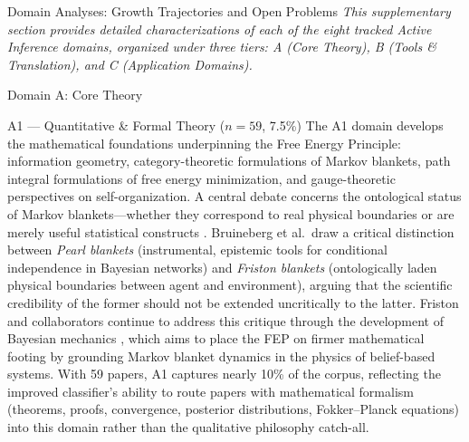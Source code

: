 \documentclass[
  ignorenonframetext,
]{beamer}
\author{\texorpdfstring{}{}}
\date{}
\begin{document}
\begin{frame}{Domain Analyses: Growth Trajectories and Open Problems
\label{sec:subfield_analyses}}
\protect{}\label{domain-analyses-growth-trajectories-and-open-problems}
\emph{This supplementary section provides detailed characterizations of
each of the eight tracked Active Inference domains, organized under
three tiers: A (Core Theory), B (Tools \& Translation), and C
(Application Domains).}

\begin{block}{Domain A: Core Theory}
\protect{}\label{domain-a-core-theory}
\begin{block}{A1 --- Quantitative \& Formal Theory (\(n = 59\), 7.5\%)}
\protect{}\label{a1-quantitative-formal-theory-n-59-7.5}
The A1 domain develops the mathematical foundations underpinning the
Free Energy Principle: information geometry, category-theoretic
formulations of Markov blankets, path integral formulations of free
energy minimization, and gauge-theoretic perspectives on
self-organization. A central debate concerns the ontological status of
Markov blankets---whether they correspond to real physical boundaries or
are merely useful statistical constructs \citep{bruineberg2022emperor}.
Bruineberg et al.~draw a critical distinction between \emph{Pearl
blankets} (instrumental, epistemic tools for conditional independence in
Bayesian networks) and \emph{Friston blankets} (ontologically laden
physical boundaries between agent and environment), arguing that the
scientific credibility of the former should not be extended uncritically
to the latter. Friston and collaborators continue to address this
critique through the development of Bayesian mechanics
\citep{sakthivadivel2023bayesian}, which aims to place the FEP on firmer
mathematical footing by grounding Markov blanket dynamics in the physics
of belief-based systems. With 59 papers, A1 captures nearly 10\% of the
corpus, reflecting the improved classifier's ability to route papers
with mathematical formalism (theorems, proofs, convergence, posterior
distributions, Fokker--Planck equations) into this domain rather than
the qualitative philosophy catch-all.
\end{block}


\end{block}
\end{frame}
\end{document}
